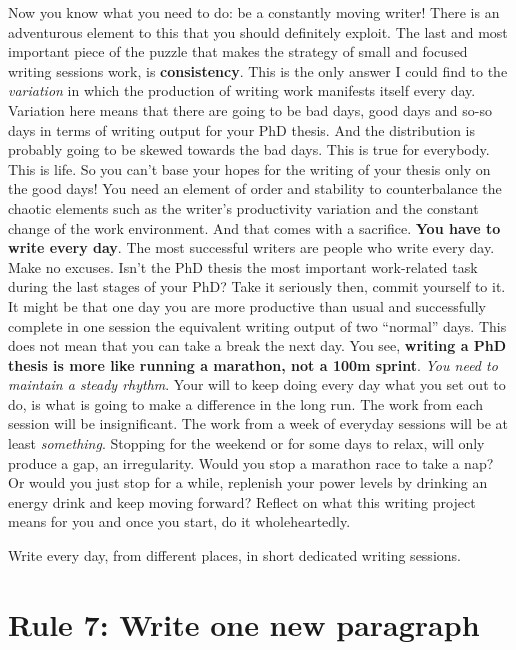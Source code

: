 \documentclass[
  12pt,
  oneside]{book}
\begin{document}
Now you know what you need to do: be a constantly moving writer!
There is an adventurous element to this that you should definitely exploit.
The last and most important piece of the puzzle that makes the strategy of small and focused writing sessions work, is \textbf{consistency}.
This is the only answer I could find to the \emph{variation} in which the production of writing work manifests itself every day.
Variation here means that there are going to be bad days, good days and so-so days in terms of writing output for your PhD thesis.
And the distribution is probably going to be skewed towards the bad days.
This is true for everybody.
This is life.
So you can't base your hopes for the writing of your thesis only on the good days!
You need an element of order and stability to counterbalance the chaotic elements such as the writer's productivity variation and the constant change of the work environment.
And that comes with a sacrifice.
\textbf{You have to write every day}.
The most successful writers are people who write every day.
Make no excuses.
Isn't the PhD thesis the most important work-related task during the last stages of your PhD?
Take it seriously then, commit yourself to it.
It might be that one day you are more productive than usual and successfully complete in one session the equivalent writing output of two ``normal'' days.
This does not mean that you can take a break the next day.
You see, \textbf{writing a PhD thesis is more like running a marathon, not a 100m sprint}.
\emph{You need to maintain a steady rhythm}.
Your will to keep doing every day what you set out to do, is what is going to make a difference in the long run.
The work from each session will be insignificant.
The work from a week of everyday sessions will be at least \emph{something}.
Stopping for the weekend or for some days to relax, will only produce a gap, an irregularity.
Would you stop a marathon race to take a nap?
Or would you just stop for a while, replenish your power levels by drinking an energy drink and keep moving forward?
Reflect on what this writing project means for you and once you start, do it wholeheartedly.

Write every day, from different places, in short dedicated writing sessions.

\hypertarget{rule7}{%
\section*{\texorpdfstring{\textbf{Rule 7:} Write one new paragraph}{Rule 7: Write one new paragraph}}\label{rule7}}
\end{document}

